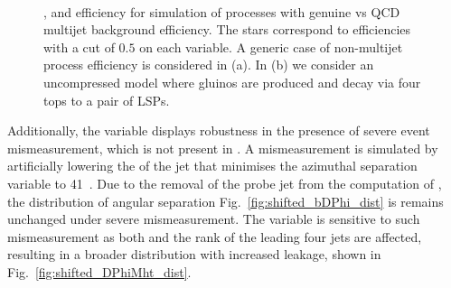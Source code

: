 \begin{figure}[!h]
 \centering
 ~
  \\
 \caption{\bdphi, \dphimhtj and \dphimhtjall efficiency for simulation of processes with genuine
 \met vs QCD multijet background efficiency. The stars correspond to
 efficiencies with a cut of $0.5$ on each variable. A generic case of
 non-multijet process efficiency is considered in (a). In (b) we
 consider an uncompressed \SUSY model where gluinos are produced and
 decay via four tops to a pair of \acp{LSP}. 
 }
 \label{fig:bDPhi_roc}
\end{figure}

Additionally, the \bdphi variable displays robustness in the presence
of severe event mismeasurement, which is not present in \dphimhtj. A
mismeasurement is simulated by artificially lowering the \pt of the
jet that minimises the azimuthal separation variable to 41~\gev. Due
to the removal of the probe jet from the computation of \bdphi, the
distribution of angular separation Fig.~\ref{fig:shifted_bDPhi_dist}
is remains unchanged under severe mismeasurement. The \dphimhtj
variable is sensitive to such mismeasurement as both \mht and the rank
of the leading four jets are affected, resulting in a broader
distribution with increased leakage, shown in
Fig.~\ref{fig:shifted_DPhiMht_dist}.

